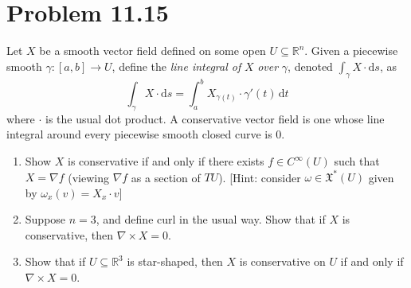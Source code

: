 \documentclass[11pt, letterpaper]{article}
\begin{document}
\section{Problem 11.15}
\begin{problem}
	Let $X$ be a smooth vector field defined on some open $U\subseteq \mathbb{R} ^n$. Given a piecewise smooth $\gamma : [a,b] \to U$, define the \emph{line integral of} $X$ \emph{over} $\gamma $, denoted $\int_\gamma X \cdot \mathrm{d} s$, as
	\[
		\int_\gamma X\cdot  \mathrm{d} s=\int _a^b X_{\gamma (t)} \cdot \gamma '(t) \,\mathrm{d} t
	\]
	where $\cdot $ is the usual dot product. A conservative vector field is one whose line integral around every piecewise smooth closed curve is 0.
	\begin{enumerate}
		\item Show $X$ is conservative if and only if there exists $f\in C^\infty (U)$ such that $X=\nabla f$ (viewing $\nabla f$ as a section of $TU$). [Hint: consider $\omega \in \mathfrak{X} ^*(U)$ given by $\omega _x(v)=X_x\cdot v$]
		\item Suppose $n=3$, and define curl in the usual way. Show that if $X$ is conservative, then $\nabla \times X=0$.
		\item Show that if $U\subseteq \mathbb{R} ^3$ is star-shaped, then $X$ is conservative on $U$ if and only if $\nabla \times X=0$.
	\end{enumerate}
\end{problem}
\end{document}
